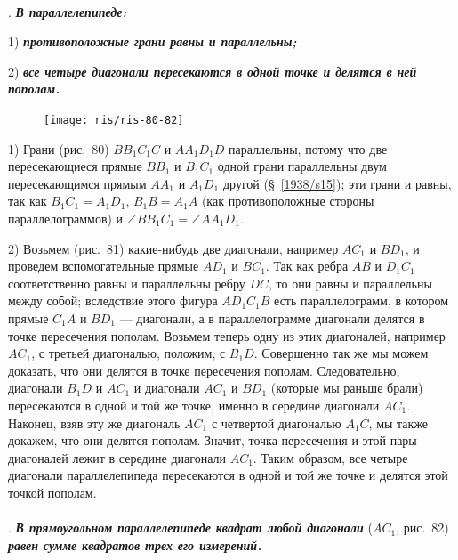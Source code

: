 \documentclass[twoside]{book}
\begin{document}
\paragraph{}\label{1938/s72}
.
\textbf{\emph{В параллелепипеде:}}

1) \textbf{\emph{противоположные грани равны и параллельны;}}

2) \textbf{\emph{все четыре диагонали пересекаются в одной точке и делятся в ней пополам.}}

\begin{figure}[h!]
\centering
\texttt{[image: ris/ris-80-82]}
\caption{}
\end{figure}

1) Грани (рис.~80) $BB_1C_1C$ и $AA_1D_1D$ параллельны, потому что две пересекающиеся прямые $BB_1$ и $B_1C_1$ одной грани параллельны двум пересекающимся прямым $AA_1$ и $A_1D_1$ другой (§~\ref{1938/s15});
эти грани и равны, так как $B_1C_1=A_1D_1$, $B_1B=A_1A$ (как противоположные стороны параллелограммов) и $\angle BB_1C_1=\angle AA_1D_1$.

2) Возьмем (рис.~81) какие-нибудь две диагонали, например $AC_1$ и $BD_1$, и проведем вспомогательные прямые $AD_1$ и $BC_1$.
Так как ребра $AB$ и $D_1C_1$ соответственно равны и параллельны ребру $DC$, то они равны и параллельны между собой;
вследствие этого фигура $AD_1C_1B$ есть параллелограмм, в котором прямые $C_1A$ и $BD_1$ --- диагонали, а в параллелограмме диагонали делятся в точке пересечения пополам. %
Возьмем теперь одну из этих диагоналей, например $AC_1$, с третьей диагональю, положим, с $B_1D$.
Совершенно так же мы можем доказать, что они делятся в точке пересечения пополам.
Следовательно, диагонали $B_1D$ и $AC_1$ и диагонали $AC_1$ и $BD_1$ (которые мы раньше брали) пересекаются в одной и той же точке, именно в середине диагонали $AC_1$. %
Наконец, взяв эту же диагональ $AC_1$ с четвертой диагональю $A_1C$, мы также докажем, что они делятся пополам.
Значит, точка пересечения и этой пары диагоналей лежит в середине диагонали $AC_1$.
Таким образом, все четыре диагонали параллелепипеда пересекаются в одной и той же точке и делятся этой точкой пополам.

\paragraph{}\label{1938/s73}
.
\textbf{\emph{В прямоугольном параллелепипеде квадрат любой диагонали}} ($AC_1$, рис.~82) \textbf{\emph{равен сумме квадратов трех его измерений.}}
\end{document}
